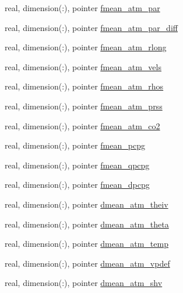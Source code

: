 \begin{DoxyCompactItemize}
real, dimension(\+:), pointer \hyperlink{structed__state__vars_1_1polygontype_a6ccda1e7760fa6a8374eb62bb956a85a}{fmean\+\_\+atm\+\_\+par}
\item 
real, dimension(\+:), pointer \hyperlink{structed__state__vars_1_1polygontype_a6770b1f55ab523b4669166475c3db81d}{fmean\+\_\+atm\+\_\+par\+\_\+diff}
\item 
real, dimension(\+:), pointer \hyperlink{structed__state__vars_1_1polygontype_a4741356dda2e40b18b7d2ec6eb345611}{fmean\+\_\+atm\+\_\+rlong}
\item 
real, dimension(\+:), pointer \hyperlink{structed__state__vars_1_1polygontype_a44af6e06582eb11c57bfd562e90c08d4}{fmean\+\_\+atm\+\_\+vels}
\item 
real, dimension(\+:), pointer \hyperlink{structed__state__vars_1_1polygontype_a80c9adca28ad949209f23832b7d929e8}{fmean\+\_\+atm\+\_\+rhos}
\item 
real, dimension(\+:), pointer \hyperlink{structed__state__vars_1_1polygontype_a05cf704b6903ead4302bdfc920369ca4}{fmean\+\_\+atm\+\_\+prss}
\item 
real, dimension(\+:), pointer \hyperlink{structed__state__vars_1_1polygontype_a5317a5f2665cfc975643916eff164201}{fmean\+\_\+atm\+\_\+co2}
\item 
real, dimension(\+:), pointer \hyperlink{structed__state__vars_1_1polygontype_a0d259912d37cebe657e90d96edc67a3a}{fmean\+\_\+pcpg}
\item 
real, dimension(\+:), pointer \hyperlink{structed__state__vars_1_1polygontype_aeeaf41d7783851a09ab30479e601d0aa}{fmean\+\_\+qpcpg}
\item 
real, dimension(\+:), pointer \hyperlink{structed__state__vars_1_1polygontype_a4b2cfa9b548b5c12ae17e7255b4659ad}{fmean\+\_\+dpcpg}
\item 
real, dimension(\+:), pointer \hyperlink{structed__state__vars_1_1polygontype_af392622dde1462f7c0a39db5f4480b1a}{dmean\+\_\+atm\+\_\+theiv}
\item 
real, dimension(\+:), pointer \hyperlink{structed__state__vars_1_1polygontype_adca8c29500a8296dd90eefbff6cef455}{dmean\+\_\+atm\+\_\+theta}
\item 
real, dimension(\+:), pointer \hyperlink{structed__state__vars_1_1polygontype_a2641a9ec4e6917ad2916fa09f03aac9f}{dmean\+\_\+atm\+\_\+temp}
\item 
real, dimension(\+:), pointer \hyperlink{structed__state__vars_1_1polygontype_a557be892aca841421a838b4d9a08f938}{dmean\+\_\+atm\+\_\+vpdef}
\item 
real, dimension(\+:), pointer \hyperlink{structed__state__vars_1_1polygontype_aba9b4616f699b2a876b3da578964e703}{dmean\+\_\+atm\+\_\+shv}

\end{DoxyCompactItemize}
